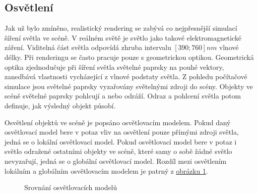 \documentclass[czech,master,dept460,male,cpp,cpdeclaration]{diploma}
\newcommand{\interval}[1]{\left[{#1}\right]}
\begin{document}
\subsection{Osvětlení}
Jak už bylo zmíněno, realistický rendering se zabývá co nejpřesnější simulací šíření světla ve scéně. V reálném světě je světlo jako takové elektromagnetické záření. Viditelná část světla odpovídá zhruba intervalu $\interval{390;760}nm$ vlnové délky. Při renderingu se často pracuje pouze s geometrickou optikou. Geometrická optika zjednodučuje při šíření světla světelné paprsky na pouhé vektory, zanedbává vlastnosti vycházející z vlnové podstaty světla. Z pohledu počítačové simulace jsou světelné paprsky vyzařovány světelnými zdroji do scény. Objekty ve scéně světelné paprsky pohlcují a nebo odráží. Odraz a pohlcení světla potom definuje, jak výsledný objekt působí. \par
Osvětlení objektů ve scéně je popsáno osvětlovacím modelem. Pokud daný osvětlovací model bere v potaz vliv na osvětlení pouze přímými zdroji světla, jedná se o lokální osvětlovací model. Pokud osvětlovací model bere v potaz i světlo odražené ostatními objekty ve scéně, které samy o sobě žádné světlo nevyzařují, jedná se o globální osvětlovací model. Rozdíl mezi osvětlením lokálním a globálním osvětlovacím modelem je patrný z \hyperref[fig:localVsGlobalIllum]{obrázku \ref{fig:localVsGlobalIllum}}.

\begin{figure}[ht]%
    \centering
    \qquad
    \caption{Srovnání osvětlovacích modelů}%
    \label{fig:localVsGlobalIllum}%
\end{figure}
\end{document}
